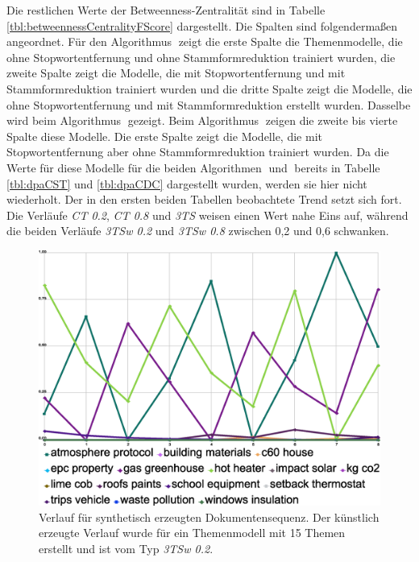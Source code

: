 Die restlichen Werte der Betweenness-Zentralität sind in Tabelle \ref{tbl:betweennessCentralityFScore} dargestellt. Die Spalten sind folgendermaßen angeordnet. Für den Algorithmus \CST$\;$zeigt die erste Spalte die Themenmodelle, die ohne Stopwortentfernung und ohne Stammformreduktion trainiert wurden, die zweite Spalte zeigt die Modelle, die mit Stopwortentfernung und mit Stammformreduktion trainiert wurden und die dritte Spalte zeigt die Modelle, die ohne Stopwortentfernung und mit Stammformreduktion erstellt wurden. Dasselbe wird beim Algorithmus \CDC$\;$gezeigt. Beim Algorithmus \TPR$\;$zeigen die zweite bis vierte Spalte diese Modelle. Die erste Spalte zeigt die Modelle, die mit Stopwortentfernung aber ohne Stammformreduktion trainiert wurden. Da die Werte für diese Modelle für die beiden Algorithmen \CST$\;$und \CDC$\;$bereits in Tabelle \ref{tbl:dpaCST} und \ref{tbl:dpaCDC} dargestellt wurden, werden sie hier nicht wiederholt. Der in den ersten beiden Tabellen beobachtete Trend setzt sich fort. Die Verläufe \textit{CT 0.2}, \textit{CT 0.8} und \textit{3TS} weisen einen Wert nahe Eins auf, während die beiden Verläufe \textit{3TSw 0.2} und \textit{3TSw 0.8} zwischen 0,2 und 0,6 schwanken. 

\begin{figure}[!hb]
\centering
\includegraphics[width=\textwidth]{images/content/06_results/runs/co2_10_3TSw0.2_tpr_betweenness.eps}
\caption{Verlauf für synthetisch erzeugten Dokumentensequenz. Der künstlich erzeugte Verlauf wurde für ein Themenmodell mit 15 Themen erstellt und ist vom Typ \textit{3TSw 0.2}.}
\label{fig:co2_10_3TSw0.2_tpr_betweenness}
\end{figure}

